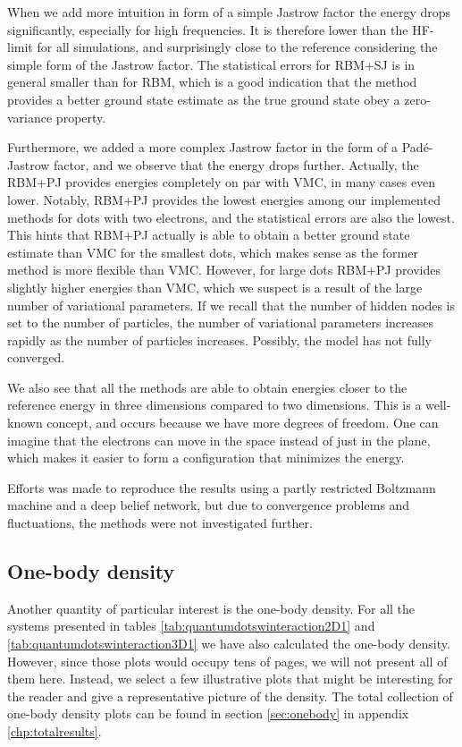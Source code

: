 When we add more intuition in form of a simple Jastrow factor the energy drops significantly, especially for high frequencies. It is therefore lower than the HF-limit for all simulations, and surprisingly close to the reference considering the simple form of the Jastrow factor. The statistical errors for RBM+SJ is in general smaller than for RBM, which is a good indication that the method provides a better ground state estimate as the true ground state obey a zero-variance property. 

Furthermore, we added a more complex Jastrow factor in the form of a Padé-Jastrow factor, and we observe that the energy drops further. Actually, the RBM+PJ provides energies completely on par with VMC, in many cases even lower. Notably, RBM+PJ provides the lowest energies among our implemented methods for dots with two electrons, and the statistical errors are also the lowest. This hints that RBM+PJ actually is able to obtain a better ground state estimate than VMC for the smallest dots, which makes sense as the former method is more flexible than VMC. However, for large dots RBM+PJ provides slightly higher energies than VMC, which we suspect is a result of the large number of variational parameters. If we recall that the number of hidden nodes is set to the number of particles, the number of variational parameters increases rapidly as the number of particles increases. Possibly, the model has not fully converged. 

We also see that all the methods are able to obtain energies closer to the reference energy in three dimensions compared to two dimensions. This is a well-known concept, and occurs because we have more degrees of freedom. One can imagine that the electrons can move in the space instead of just in the plane, which makes it easier to form a configuration that minimizes the energy. 

Efforts was made to reproduce the results using a partly restricted Boltzmann machine and a deep belief network, but due to convergence problems and fluctuations, the methods were not investigated further. 

\subsection{One-body density}
Another quantity of particular interest is the one-body density. For all the systems presented in tables \eqref{tab:quantumdotswinteraction2D1} and \eqref{tab:quantumdotswinteraction3D1} we have also calculated the one-body density. However, since those plots would occupy tens of pages, we will not present all of them here. Instead, we select a few illustrative plots that might be interesting for the reader and give a representative picture of the density. The total collection of one-body density plots can be found in section \ref{sec:onebody} in appendix \ref{chp:totalresults}. 

